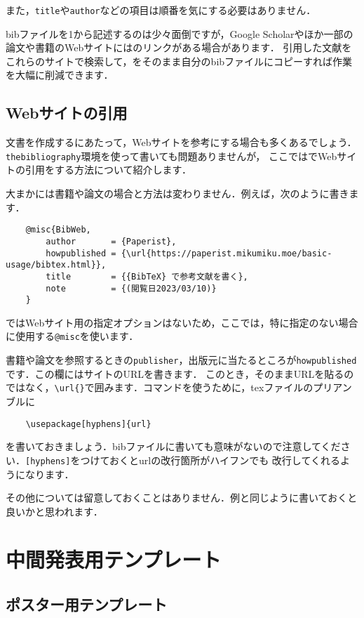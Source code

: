 \documentclass[a4paper,11pt]{jsreport}
\numberwithin{equation}{section}
\theoremstyle{definition}
\begin{document}
また，\verb|title|や\verb|author|などの項目は順番を気にする必要はありません．

bibファイルを1から記述するのは少々面倒ですが，Google Scholarやほか一部の論文や書籍のWebサイトには{\BibTeX}のリンクがある場合があります．
引用した文献をこれらのサイトで検索して，{\BibTeX}をそのまま自分のbibファイルにコピーすれば作業を大幅に削減できます．

\section{Webサイトの引用}

文書を作成するにあたって，Webサイトを参考にする場合も多くあるでしょう．\verb|thebibliography|環境を使って書いても問題ありませんが，
ここでは{\BibTeX}でWebサイトの引用をする方法について紹介します．

大まかには書籍や論文の場合と方法は変わりません．例えば，次のように書きます\cite{BibWeb}．
\begin{verbatim}
    @misc{BibWeb,
        author       = {Paperist},
        howpublished = {\url{https://paperist.mikumiku.moe/basic-usage/bibtex.html}},
        title        = {{BibTeX} で参考文献を書く},
        note         = {(閲覧日2023/03/10)}
    }
\end{verbatim}

{\BibTeX}ではWebサイト用の指定オプションはないため，ここでは，特に指定のない場合に使用する\verb|@misc|を使います．

書籍や論文を参照するときの\verb|publisher|，出版元に当たるところが\verb|howpublished|です．この欄にはサイトのURLを書きます．
このとき，そのままURLを貼るのではなく，\verb|\url{}|で囲みます．コマンドを使うために，texファイルのプリアンブルに
\begin{verbatim}
    \usepackage[hyphens]{url}
\end{verbatim}
を書いておきましょう．bibファイルに書いても意味がないので注意してください．\verb|[hyphens]|をつけておくとurlの改行箇所がハイフンでも
改行してくれるようになります．

その他については留意しておくことはありません．例と同じように書いておくと良いかと思われます．


\chapter{中間発表用テンプレート}


\section{ポスター用テンプレート}
\end{document}
